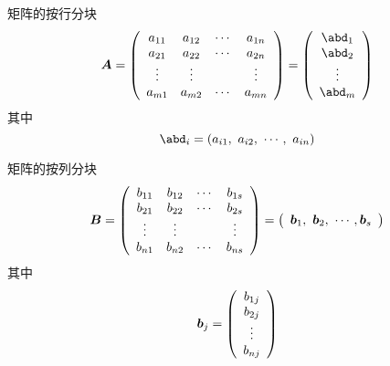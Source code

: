 \begin{frame}
  \begin{footnotesize}
    \begin{block}{矩阵的按行分块}
      $$
      \A = \left(
      \begin{array}{cccc}
        a_{11} & a_{12} & \cd & a_{1n}\\
        a_{21} & a_{22} & \cd & a_{2n}\\
        \vd & \vd & & \vd \\
        a_{m1} & a_{m2} & \cd & a_{mn}
      \end{array}
      \right)
      = \left(
      \begin{array}{c}
        \abd_1\\
        \abd_2\\
        \vd \\
        \abd_m
      \end{array}
      \right)
      $$
      其中
      $$
      \abd_i = (a_{i1}, ~a_{i2}, ~\cd, ~a_{in})
      $$
    \end{block}
    
  \end{footnotesize}
   
\end{frame}


\begin{frame}
  \begin{footnotesize}
    \begin{block}{矩阵的按列分块}
      $$
      \boldsymbol{B} = \left(
      \begin{array}{cccc}
        b_{11} & b_{12} & \cdots & b_{1s}\\
        b_{21} & b_{22} & \cdots & b_{2s}\\
        \vdots & \vdots & & \vdots \\
        b_{n1} & b_{n2} & \cdots & b_{ns}
      \end{array}
      \right)
      = \left(
      \begin{array}{c}
        {\boldsymbol{b}}_1, ~ {\boldsymbol{b}}_2, ~ \cdots, {\boldsymbol{b}}_s
      \end{array}
      \right)
      $$
      其中
      $$
      {\boldsymbol{b}}_j = \left(
      \begin{array}{c}
        b_{1j}\\
        b_{2j}\\
        \vdots\\
        b_{nj}
      \end{array}
      \right)
      $$
    \end{block}
      
  \end{footnotesize}
\end{frame}




